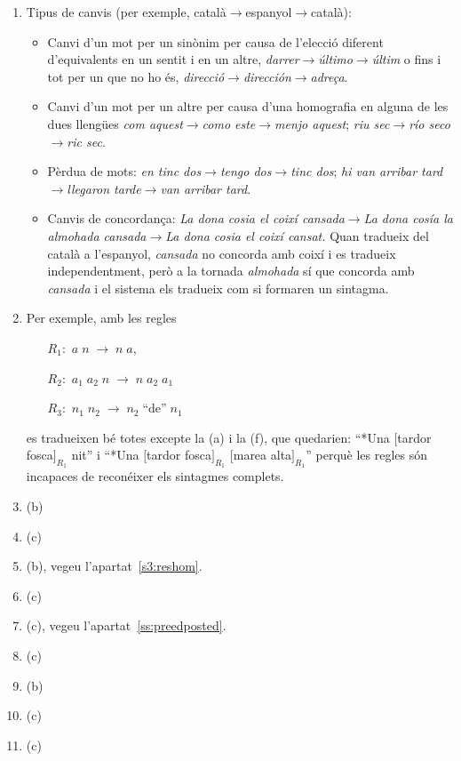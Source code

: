 \begin{enumerate}
\item Tipus de canvis (per exemple, català$\to$espanyol$\to$català):
  \begin{itemize}
  \item Canvi d'un mot per un sinònim per causa de l'elecció diferent
    d'equivalents en un sentit i en un altre,
    \emph{darrer}$\to$\emph{último}$\to$\emph{últim} o fins i tot per
    un que no ho és,
    \emph{direcció}$\to$\emph{dirección}$\to$\emph{adreça}.
  \item Canvi d'un mot per un altre per causa d'una homografia en
    alguna de les dues llengües \emph{com aquest}$\to$\emph{como
      este}$\to$\emph{menjo aquest}; \emph{riu sec}$\to$\emph{río
      seco}$\to$\emph{ric sec}.
  \item Pèrdua de mots: \emph{en tinc dos}$\to$\emph{tengo
      dos}$\to$\emph{tinc dos}; \emph{hi van arribar
      tard}$\to$\emph{llegaron tarde}$\to$\emph{van arribar tard}.
  \item Canvis de concordança: \emph{La dona cosia el coixí
      cansada}$\to$\emph{La dona cosía la almohada
      cansada}$\to$\emph{La dona cosia el coixí cansat.} Quan tradueix
    del català a l'espanyol, \emph{cansada} no concorda amb coixí i es
    tradueix independentment, però a la tornada \emph{almohada} sí que
    concorda amb \emph{cansada} i el sistema els tradueix com si
    formaren un sintagma.
  \end{itemize}

\item Per exemple, amb les regles
  \begin{itemize}
  \item[$R_1:$] $a\; n\;\to\; n\; a$,
  \item[$R_2:$] $a_1\; a_2\; n\;\to\; n\; a_2\;
    a_1$ 
  \item[$R_3:$] $n_1\; n_2\;\to\; n_2\; \mbox{``de''}\; n_1$
  \end{itemize}
  es tradueixen bé totes excepte la (a) i la (f), que quedarien:
  ``*Una $[$tardor fosca$]_{R_1}$ nit'' i ``*Una $[$tardor
  fosca$]_{R_1}$ $[$marea alta$]_{R_1}$'' perquè les regles són
  incapaces de reconéixer els sintagmes complets.
 
\item (b)
\item (c)
\item (b), vegeu l'apartat~\ref{s3:reshom}.
\item (c)
\item (c), vegeu l'apartat~\ref{ss:preedposted}.
\item (c)
\item (b)
\item (c)
\item (c)


\end{enumerate}
